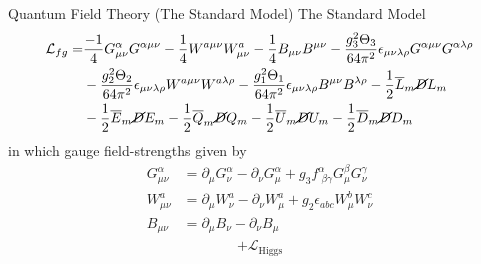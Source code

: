 \documentclass{beamer}
\begin{document}
	\begin{frame}{Quantum Field Theory (The Standard Model)}
	The Standard Model
		\begin{equation*}
			\begin{aligned}
				\mathcal{L}_{fg} = & \frac{-1}{4} G^{\alpha}_{\mu \nu} G^{\alpha \mu \nu} - \frac{1}{4} W^{a\mu \nu} W^{a}_{\mu \nu} - \frac{1}{4} B_{\mu \nu} B^{\mu \nu} - \frac{g_3^2 \Theta_3}{64\pi^2} \epsilon_{\mu \nu \lambda \rho} G^{\alpha \mu \nu} G^{\alpha \lambda \rho} \\
& - \frac{g_2^2 \Theta_2}{64 \pi^2} \epsilon_{\mu \nu \lambda \rho} W^{a \mu \nu} W^{a\lambda \rho } - \frac{g_1^2 \Theta_1}{64 \pi^2 } \epsilon_{\mu \nu \lambda \rho} B^{\mu \nu} B^{\lambda \rho} - \frac{1}{2} \overline{L}_m \cancel{D} L_m \\ 
& - \frac{1}{2} \overline{E}_m \cancel{D} E_m - \frac{1}{2} \overline{Q}_m \cancel{D} Q_m - \frac{1}{2} \overline{U}_m \cancel{D} U_m - \frac{1}{2} \overline{D}_m \cancel{D} D_m
			\end{aligned}
		\end{equation*}
in which gauge field-strengths given by
\[
\begin{aligned}
G^{\alpha}_{\mu \nu} & = \partial_{\mu} G_{\nu}^{\alpha} - \partial_{\nu} G_{\mu}^{\alpha} + g_3 f^{\alpha}_{\, \, \beta \gamma} G_{\mu}^{\beta} G_{\nu}^{\gamma} \\
W^a_{\mu \nu} & = \partial_{\mu} W_{\nu}^a - \partial_{\nu} W^a_{\mu} + g_2 \epsilon_{abc} W^b_{\mu} W^c_{\nu} \\
B_{\mu \nu} & = \partial_{\mu} B_{\nu} - \partial_{\nu} B_{\mu}
\end{aligned}
\]
\[
\begin{gathered}
 + \mathcal{L}_{\text{Higgs}}
\end{gathered}
\]
	\end{frame}
\end{document}
